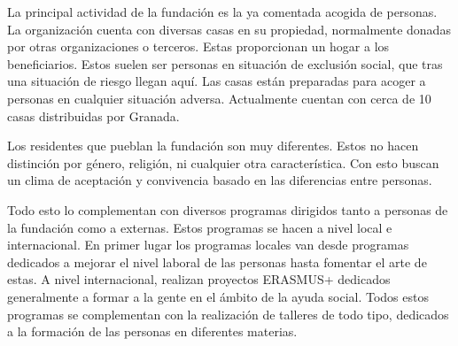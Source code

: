 La principal actividad de la fundación es la ya comentada acogida de personas. La organización cuenta con diversas casas en su propiedad, normalmente donadas por otras organizaciones o terceros. Estas proporcionan un hogar a los beneficiarios. Estos suelen ser personas en situación de exclusión social, que tras una situación de riesgo llegan aquí. Las casas están preparadas para acoger a personas en cualquier situación adversa. Actualmente cuentan con cerca de 10 casas distribuidas por Granada.

Los residentes que pueblan la fundación son muy diferentes. Estos no hacen distinción por género, religión, ni cualquier otra característica. Con esto buscan un clima de aceptación y convivencia basado en las diferencias entre personas.

Todo esto lo complementan con diversos programas dirigidos tanto a personas de la fundación como a externas. Estos programas se hacen a nivel local e internacional. En primer lugar los programas locales van desde programas dedicados a mejorar el nivel laboral de las personas hasta fomentar el arte de estas. A nivel internacional, realizan proyectos ERASMUS+ dedicados generalmente a formar a la gente en el ámbito de la ayuda social. Todos estos programas se complementan con la realización de talleres de todo tipo, dedicados a la formación de las personas en diferentes materias.


